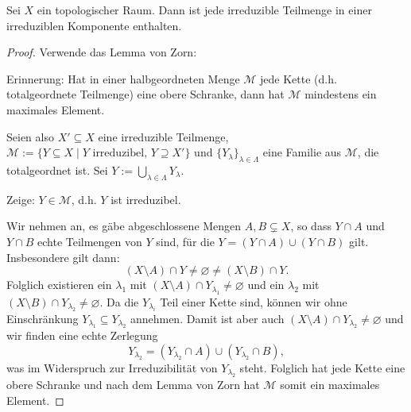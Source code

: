 \documentclass[a4paper,12pt]{scrbook}
\newtheorem{proof}{Beweis}
\def\M{\mathcal{M}}
\newcommand{\leer}{\ensuremath{\varnothing}}
\begin{document}
\begin{prop}\label{1.2.10} Sei $X$ ein topologischer Raum. Dann ist jede irreduzible Teilmenge in einer irreduziblen Komponente enthalten.\end{prop}
\begin{proof} Verwende das Lemma von Zorn:

{\sc Erinnerung:} Hat in einer halbgeordneten Menge $\M$ jede Kette (d.h. totalgeordnete Teilmenge) eine obere Schranke, dann hat $\M$ mindestens ein maximales Element.

Seien also $X'\subseteq X$ eine irreduzible Teilmenge, $\M:=\{Y\subseteq X\mid Y\text{ irreduzibel, }Y\supseteq X'\}$ und $\{Y_{\lambda}\}_{\lambda\in\Lambda}$ eine Familie aus $\M$, die totalgeordnet ist. Sei $\displaystyle Y:=\bigcup_{\lambda\in\Lambda}Y_{\lambda}$.

{\sc Zeige:} $Y\in\M$, d.h. $Y$ ist irreduzibel.

Wir nehmen an, es gäbe abgeschlossene Mengen $A,B\subsetneq X$, so dass $Y\cap A$ und $Y\cap B$ echte Teilmengen von $Y$ sind, für die $Y=(Y\cap A)\cup(Y\cap B)$ gilt. Insbesondere gilt dann:
\[(X\setminus A)\cap Y\neq\leer\neq (X\setminus B)\cap Y.\]
Folglich existieren ein $\lambda_{1}$ mit $(X\setminus A)\cap Y_{\lambda_{1}}\neq\leer$ und ein $\lambda_{2}$ mit $(X\setminus B)\cap Y_{\lambda_{2}}\neq\leer$. Da die $Y_{\lambda_{i}}$ Teil einer Kette sind, können wir ohne Einschränkung $Y_{\lambda_{1}}\subseteq Y_{\lambda_{2}}$ annehmen. Damit ist aber auch $(X\setminus A)\cap Y_{\lambda_{2}}\neq\leer$ und wir finden eine echte Zerlegung
\[Y_{\lambda_{2}}=(Y_{\lambda_{2}}\cap A)\cup(Y_{\lambda_{2}}\cap B),\]
was im Widerspruch zur Irreduzibilität von $Y_{\lambda_{2}}$ steht. Folglich hat jede Kette eine obere Schranke und nach dem Lemma von Zorn hat $\M$ somit ein maximales Element.
\end{proof}
\end{document}
